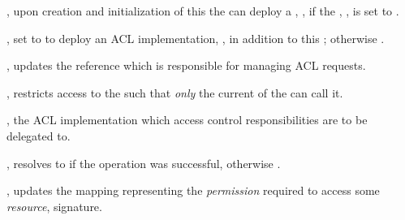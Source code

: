 \begin{code}
  \item \operations

  \begin{constructor}
    \item {}, upon creation and initialization
      of this  the  can deploy a
      , , if the , , is set to .

      \begin{parameters}
      \item {}, set to  to deploy an ACL
        implementation, , in addition to this
        ; otherwise .
      \end{parameters}
  \end{constructor}

  \begin{functions}
    \item {}, updates the
       reference which is responsible for managing ACL requests.

      \begin{modifiers}
        \item {}, restricts access to the
           such that \emph{only} the current  of the
           can call it.
      \end{modifiers}

      \begin{parameters}
        \item {}, the ACL implementation which access
          control responsibilities are to be delegated to.
      \end{parameters}

      \begin{returns}
        \item {}, resolves to  if the operation was
          successful, otherwise .
      \end{returns}


    \item {},
      updates the mapping representing the \emph{permission} required to access
      some \emph{resource},  signature.


\end{functions}
\end{code}
